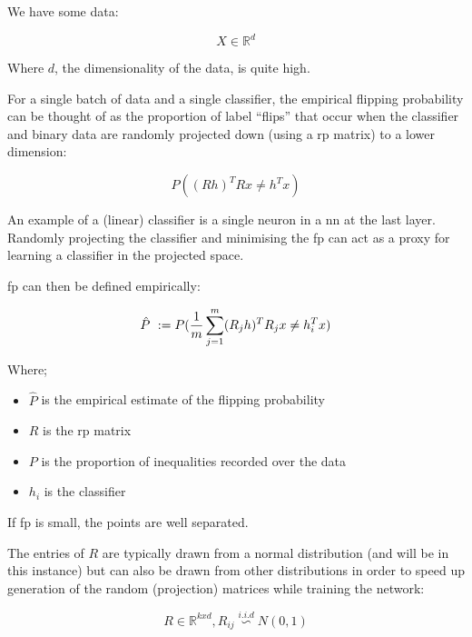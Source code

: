 We have some data:

\begin{equation}
X \in \mathds{R}^d 
\end{equation}

Where $d$, the dimensionality of the data, is quite high. \bigskip

For a single batch of data and a single classifier, the empirical flipping probability can be thought of as the proportion of label \enquote{flips} that occur when the classifier and binary data are randomly projected down (using a \gls{rp} matrix) to a lower dimension:

\begin{equation}
P((R h)^T Rx \neq h^{T}x)  
\end{equation}

An example of a (linear) classifier is a single neuron in a \gls{nn} at the last layer. Randomly projecting the classifier and minimising the \gls{fp} can act as a proxy for learning a classifier in the projected space. \smallskip

\gls{fp} can then be defined empirically:

\begin{equation}
\hat{P}\ := \\ P(\frac{1}{m}\sum_{j = 1}^m (R_j h)^T R_{j}x \neq h_i^{T}x)  
\end{equation}

Where;  \smallskip

\begin{itemize}
\item $\hat{P}$ is the empirical estimate of the flipping probability  
\item $R$ is the \gls{rp} matrix  
\item $P$ is the proportion of inequalities recorded over the data 
\item $h_i$ is the classifier  
\end{itemize}

If  \gls{fp} is small, the points are well separated. \bigskip

The entries of $R$ are typically drawn from a normal distribution (and will be in this instance) but can also be drawn from other distributions in order to speed up generation of the random (projection) matrices while training the network:

\begin{equation}
R \in \mathds{R}^{kxd}, R_{ij} \stackrel{i.i.d}{\backsim} N(0,1) 
\end{equation}

